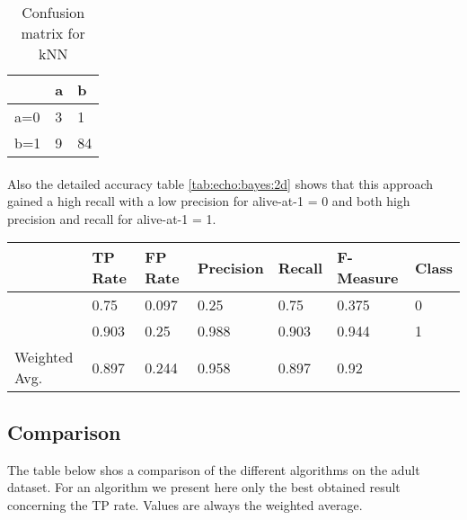 \documentclass[paper=a4, fontsize=11pt]{scrartcl} %
\numberwithin{equation}{section} %
\numberwithin{figure}{section} %
\numberwithin{table}{section} %
\begin{document}
\begin{table}[h]
\centering
\begin{tabular}{|l|ll|}
\hline
 & a &	b \\
\hline
a=0 & 3 & 1 \\
b=1 & 9 & 84\\
\hline
\end{tabular}
\caption{Confusion matrix for kNN}
\label{tab:echo:bayes:2c}
\end{table}

\paragraph{}Also the detailed accuracy table \ref{tab:echo:bayes:2d} shows that this approach gained a high recall with a low precision for alive-at-1 = 0 and both high precision and recall for alive-at-1 = 1.

\begin{table*}[htb]\centering
  \begin{tabular*}{\columnwidth}{@{}lllllll@{}}
      \toprule 
              &  TP Rate & FP Rate & Precision & Recall & F-Measure & Class    \\  \midrule
              &   0.75   & 0.097   & 0.25      & 0.75   & 0.375     & 0 \\
              &   0.903  & 0.25    & 0.988     & 0.903  & 0.944     & 1 \\
Weighted Avg. &   0.897  & 0.244   & 0.958     & 0.897  & 0.92      &   \\ \bottomrule
  \end{tabular*}
\caption{Naive Bayes with SMOTE filter} 
\label{tab:echo:bayes:2d}
\end{table*}


\subsection{Comparison}

The table below shos a comparison of the different algorithms on the adult dataset. For an algorithm we present here only the best obtained result concerning the TP rate. Values are always the weighted average.
\end{document}
